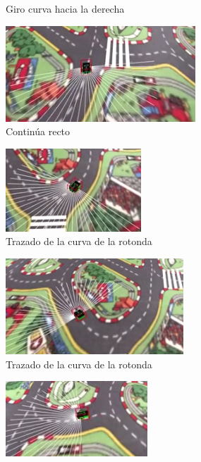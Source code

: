 \documentclass{report}
\begin{document}
\begin{figure}[h]
\begin{subfigure}{.5\textwidth}
  \caption{Giro curva hacia la derecha}
  \label{fig:sub-third}
\end{subfigure}
\begin{subfigure}{.5\textwidth}
  \centering
  \includegraphics[width=.7\linewidth]{images/cap4/4.png}  
  \caption{Continúa recto}
  \label{fig:sub-fourth}
\end{subfigure}
\begin{subfigure}{.5\textwidth}
  \centering
  \includegraphics[width=.7\linewidth]{images/cap4/5.png}  
  \caption{Trazado de la curva de la rotonda}
  \label{fig:sub-first}
\end{subfigure}
\begin{subfigure}{.5\textwidth}
  \centering
  \includegraphics[width=.7\linewidth]{images/cap4/6.png}  
  \caption{Trazado de la curva de la rotonda}
  \label{fig:sub-second}
\end{subfigure}
\begin{subfigure}{.5\textwidth}
  \centering
  \includegraphics[width=.7\linewidth]{images/cap4/7.png}  

\end{subfigure}
\end{figure}
\end{document}
